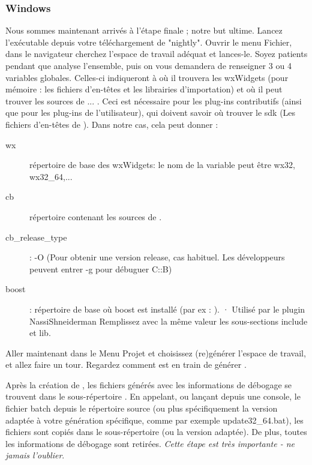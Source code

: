 \subsubsection{Windows}

Nous sommes maintenant arrivés à l'étape finale ; notre but ultime. Lancez l'exécutable \codeblocks depuis votre téléchargement de "nightly". Ouvrir le menu Fichier, dans le navigateur cherchez l'espace de travail adéquat et lances-le. Soyez patients pendant que \codeblocks analyse l'ensemble, puis on vous demandera de renseigner 3 ou 4 variables globales. Celles-ci indiqueront à \codeblocks où il trouvera les wxWidgets (pour mémoire : les fichiers d'en-têtes et les librairies d'importation) et où il peut trouver les sources de ... \codeblocks. Ceci est nécessaire pour les plug-ins contributifs (ainsi que pour les plug-ins de l'utilisateur), qui doivent savoir où trouver le sdk (Les fichiers d'en-têtes de \codeblocks). Dans notre cas, cela peut donner :
\begin{description}
\item[wx]  répertoire de base des wxWidgets: le nom de la variable peut être wx32, wx32\_64,...
\item[cb]  répertoire contenant les sources de \codeblocks.
\item[cb\_release\_type] : -O (Pour obtenir une version release, cas habituel.
         Les développeurs peuvent entrer -g pour débuguer C::B)
\item[boost] : répertoire de base où boost est installé (par ex : ).
·         Utilisé par le plugin NassiShneiderman
          Remplissez avec la même valeur les sous-sections include et lib.
\end{description}

Aller maintenant dans le Menu Projet et choisissez (re)générer l'espace de travail, et allez faire un tour. Regardez comment \codeblocks est en train de générer \codeblocks.

Après la création de \codeblocks, les fichiers générés avec les informations de débogage se trouvent dans le sous-répertoire . En appelant, ou lançant depuis une console, le fichier batch  depuis le répertoire source  (ou plus spécifiquement la version adaptée à votre génération spécifique, comme par exemple update32\_64.bat), les fichiers sont copiés dans le sous-répertoire  (ou la version adaptée). De plus, toutes les informations de débogage sont retirées. \textit{Cette étape est très importante - ne jamais l'oublier}.

